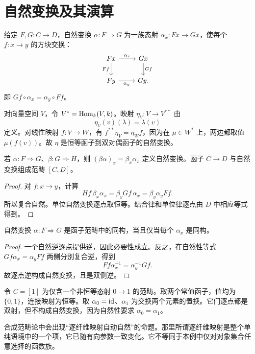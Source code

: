 \section{自然变换及其演算}
\begin{definition}[自然变换]
给定 $F,G:C\to D$，自然变换 $\alpha:F\Rightarrow G$ 为一族态射 $\alpha_x:Fx\to Gx$，使每个 $f:x\to y$ 的方块交换：
\[
\begin{tikzcd}
Fx\ar[r,"\alpha_x"]\ar[d,"Ff"']&Gx\ar[d,"Gf"]\\
Fy\ar[r,"\alpha_y"']&Gy.
\end{tikzcd}
\]
即 $Gf\circ\alpha_x=\alpha_y\circ Ff$。
\end{definition}
\begin{example}[双对偶映射]
对向量空间 $V$，令 $V^*=\operatorname{Hom}_k(V,k)$。映射 $\eta_V:V\to V^{**}$ 由
\[
\eta_V(v)(\lambda)=\lambda(v)
\]
定义。对线性映射 $f:V\to W$，有 $f^{**}\eta_V=\eta_Wf$，因为在 $\mu\in W^*$ 上，两边都取值 $\mu(f(v))$。故 $\eta$ 是恒等函子到双对偶函子的自然变换。
\end{example}
\begin{proposition}[自然变换的逐点复合]
若 $\alpha:F\Rightarrow G$、$\beta:G\Rightarrow H$，则 $(\beta\alpha)_x=\beta_x\alpha_x$ 定义自然变换。函子 $C\to D$ 与自然变换组成范畴 $[C,D]$。
\end{proposition}
\begin{proof}
对 $f:x\to y$，计算
\[
Hf\,\beta_x\alpha_x
=\beta_yGf\,\alpha_x
=\beta_y\alpha_yFf.
\]
所以复合自然。单位自然变换逐点取恒等。结合律和单位律逐点由 $D$ 中相应等式得到。
\end{proof}
\begin{proposition}
自然变换 $\alpha:F\Rightarrow G$ 是函子范畴中的同构，当且仅当每个 $\alpha_x$ 是同构。
\end{proposition}
\begin{proof}
一个自然逆逐点提供逆，因此必要性成立。反之，在自然性等式
$Gf\alpha_x=\alpha_yFf$ 两侧分别复合逆，得到
\[
Ff\alpha_x^{-1}=\alpha_y^{-1}Gf.
\]
故逐点逆构成自然变换，且是双侧逆。
\end{proof}
\begin{example}[逐点给定尚不保证自然]
令 $C=[1]$ 为仅含一个非恒等态射 $0\to1$ 的范畴。取两个常值函子，值均为 $\{0,1\}$，连接映射为恒等。取 $\alpha_0=\operatorname{id}$、$\alpha_1$ 为交换两个元素的置换。它们逐点都是双射，但不构成自然变换，因为自然性要求 $\alpha_0=\alpha_1$。
\end{example}
\begin{remark}
合成范畴论中会出现“逐纤维映射自动自然”的命题。那里所谓逐纤维映射是整个单纯语境中的一个项，它已随有向参数一致变化。它不等同于本例中仅对对象集合任意选择的函数族。
\end{remark}

